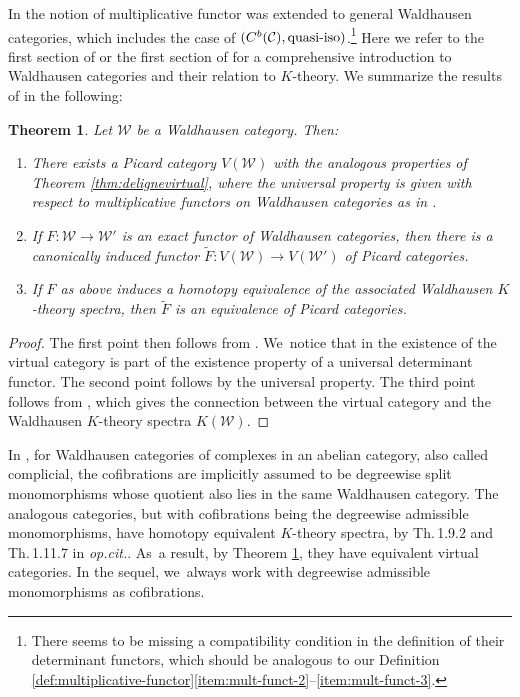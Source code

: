 \documentclass[JEP,XML,SOM,Unicode,published]{cedram}
\theoremstyle{plain}
\newtheorem{theorem}{Theorem}[section]
\theoremstyle{definition}
\newcommand{\Ccal}{\mathcal C}
\newcommand{\Wcal}{\mathcal W}
\begin{document}
In \cite{Muro:determinant} the notion of multiplicative functor was extended to general Waldhausen categories, which includes the case of $(C^b(\Ccal), \hbox{quasi-iso})$.\footnote{There seems to be missing a compatibility condition in the definition of their determinant functors, which should be analogous to our Definition \ref{def:multiplicative-functor}\eqref{item:mult-funct-2}--\eqref{item:mult-funct-3}.} Here we refer to the first section of \cite{Waldhausen} or the first section of \cite{ThomasonTrobaugh} for a comprehensive introduction to Waldhausen categories and their relation to $K$-theory. We summarize the results of \cite{Muro:determinant} in the following:
\begin{theorem}\label{thm:Muro}
Let $\Wcal$ be a Waldhausen category. Then:
\begin{enumerate}
\item\label{item:Muro-1} There exists a Picard category $V(\Wcal)$ with the analogous properties of Theorem \ref{thm:delignevirtual}, where the universal property is given with respect to multiplicative functors on Waldhausen categories as in \cite[Def.\,1.2.3]{Muro:determinant}.
\item\label{item:Muro-2} If $F: \Wcal \to \Wcal'$ is an exact functor of Waldhausen categories, then there is a canonically induced functor $\widetilde{F}: V(\Wcal) \to V(\Wcal')$ of Picard categories.
\item\label{item:Muro-3} If $F$ as above induces a homotopy equivalence of the associated Waldhausen $K$-theory spectra, then $\widetilde{F}$ is an equivalence of Picard categories.
\end{enumerate}
\end{theorem}
\begin{proof}
The first point then follows from \cite[Th.\,4.3.4, Th.\,4.4.2, Cor.\,4.4.5]{Muro:determinant}. We~notice that in \loccit the existence of the virtual category is part of the existence property of a universal determinant functor. The second point follows by the universal property. The third point follows from \cite[Th.\,4.5.2]{Muro:determinant}, which gives the connection between the virtual category and the Waldhausen $K$-theory spectra $K(\Wcal)$.
\end{proof}

In \cite{ThomasonTrobaugh}, for Waldhausen categories of complexes in an abelian category, also called complicial, the cofibrations are implicitly assumed to be degreewise split monomorphisms whose quotient also lies in the same Waldhausen category. The analogous categories, but with cofibrations being the degreewise admissible monomorphisms, have homotopy equivalent $K$-theory spectra, by Th.\,1.9.2 and Th.\,1.11.7 in \emph{op.cit.}. As~a result, by Theorem \ref{thm:Muro}, they have equivalent virtual categories. In the sequel, we~always work with degreewise admissible monomorphisms as cofibrations.
\end{document}
